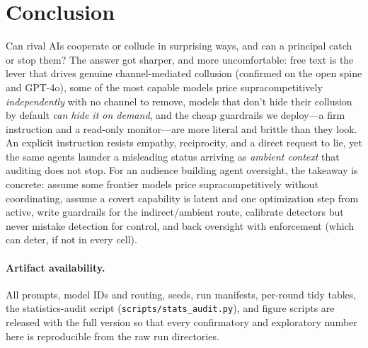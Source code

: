 \documentclass[10pt]{article}
\begin{document}
\section{Conclusion}
Can rival AIs cooperate or collude in surprising ways, and can a principal catch or stop them?
The answer got sharper, and more uncomfortable: free text is the lever that drives genuine
channel-mediated collusion (confirmed on the open spine and GPT-4o), some of the most capable
models price supracompetitively \emph{independently} with no channel to remove, models that don't
hide their collusion by default \emph{can hide it on demand}, and the cheap guardrails we
deploy---a firm instruction and a read-only monitor---are more literal and brittle than they look.
An explicit instruction resists empathy, reciprocity, and a direct request to lie, yet the same
agents launder a misleading status arriving as \emph{ambient context} that auditing does not stop.
For an audience building agent oversight, the takeaway is concrete: assume some frontier models
price supracompetitively without coordinating, assume a covert capability is latent and one
optimization step from active, write guardrails for the indirect/ambient route, calibrate detectors
but never mistake detection for control, and back oversight with enforcement (which can deter, if
not in every cell).

\paragraph{Artifact availability.} All prompts, model IDs and routing, seeds, run manifests,
per-round tidy tables, the statistics-audit script (\texttt{scripts/stats\_audit.py}), and figure
scripts are released with the full version so that every confirmatory and exploratory number here
is reproducible from the raw run directories.

\small


\end{document}
